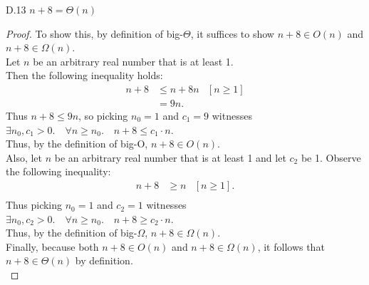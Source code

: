 \documentclass[10pt]{article}
\begin{document}
\begin{enumerate}[label={}]
            D.13 $n+8=\Theta(n)$
            \begin{proof}
                  To show this, by definition of big-$\Theta$, it suffices to show $n+8 \in O\left(n\right)$ and $n+8 \in \Omega\left(n\right)$.\\
                  Let $n$ be an arbitrary real number that is at least 1.\\
                  Then the following inequality holds:
                  $$
                        \begin{aligned}
                              n+8 & \leq n+8n
                                  & {\left[n \geq 1\right] } \\
                                  & = 9n .
                        \end{aligned}
                  $$
                  Thus $n+8 \leq 9n$, so picking $n_0=1$ and $c_1=9$ witnesses \\$\exists n_0, c_1>0 .\quad \forall n \geq n_0 .\quad n+8 \leq c_1 \cdot n$.\\
                        Thus, by the definition of big-O, $n+8 \in O\left(n\right)$.\\
                        Also, let $n$ be an arbitrary real number that is at least 1 and let $c_2$ be 1. Observe the following inequality:
                        $$
                              \begin{aligned}
                                    n+8 & \geq n
                                        & {\left[n \geq 1\right] }. \\
                              \end{aligned}
                        $$
                        Thus picking $n_0=1$ and $c_2=1$ witnesses \\$\exists n_0, c_2>0 .\quad \forall n \geq n_0 .\quad n+8 \geq c_2 \cdot n$.\\
                        Thus, by the definition of big-$\Omega$, $n+8 \in \Omega\left(n\right)$.\\
                        Finally, because both $n+8 \in O\left(n\right)$ and $n+8 \in \Omega\left(n\right)$, it follows that $n+8\in\Theta(n)$ by definition.\\
            \end{proof}


\end{enumerate}
\end{document}
